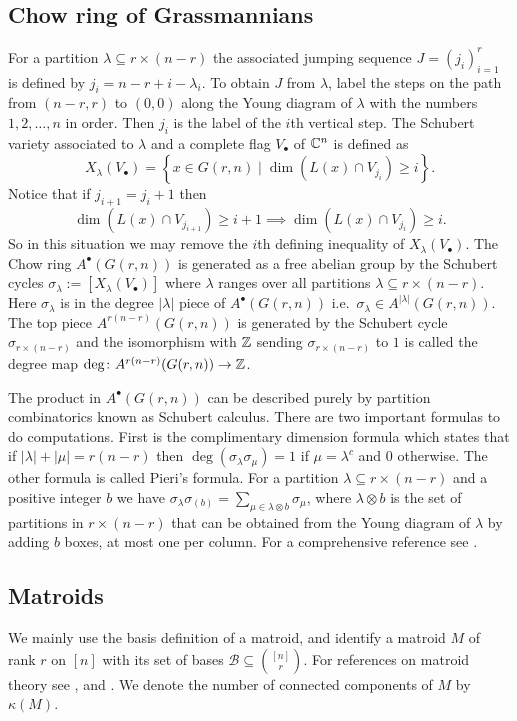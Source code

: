\subsection{Chow ring of Grassmannians}
For a partition \(\lambda \subseteq r\times (n-r)\) the associated jumping sequence \(J = (j_i)_{i = 1}^r\) is defined by \(j_i = n-r+i-\lambda_i\). To obtain \(J\) from \(\lambda\), label the steps on the path from \((n-r,r)\) to \((0,0)\) along the Young diagram of \(\lambda\) with the numbers \(1,2,\dots , n\) in order. Then \(j_i\) is the label of the \(i\)th vertical step. The Schubert variety associated to \(\lambda\) and a complete flag \(V_\bullet\) of \({\mathbb C}^n\) is defined as 
\[
    X_\lambda(V_\bullet) = \left\{ x \in G(r,n) \mid \dim(L(x) \cap V_{j_i}) \geq i \right\}.
\]
Notice that if \(j_{i+1} = j_{i} + 1\) then
\[
    \dim(L(x) \cap V_{j_{i+1}}) \geq i+1 \implies \dim(L(x) \cap V_{j_i}) \geq i.
\]
So in this situation we may remove the \(i\)th defining inequality of \(X_\lambda(V_\bullet)\). The Chow ring $A^\bullet(G(r,n))$ is generated as a free abelian group by the Schubert cycles $\sigma_\lambda := [X_\lambda(V_\bullet)]$ where $\lambda$ ranges over all partitions $\lambda \subseteq r\times(n-r)$. Here $\sigma_\lambda$ is in the degree $|\lambda|$ piece of $A^\bullet(G(r,n))$ i.e.\ $\sigma_\lambda \in A^{|\lambda|}(G(r,n))$. The top piece $A^{r(n-r)}(G(r,n))$ is generated by the Schubert cycle $\sigma_{r\times(n-r)}$ and the isomorphism with ${\mathbb Z}$ sending $\sigma_{r\times(n-r)}$ to $1$ is called the degree map $\deg\colon A^{r(n-r)}(G(r,n)) \to {\mathbb Z}$.

The product in $A^\bullet(G(r,n))$ can be described purely by partition combinatorics known as Schubert calculus. There are two important formulas to do computations. First is the complimentary dimension formula which states that if $|\lambda| + |\mu| = r(n-r)$ then $\deg(\sigma_\lambda \sigma_\mu) = 1$ if $\mu = \lambda^c$ and $0$ otherwise. The other formula is called Pieri's formula. For a partition $\lambda \subseteq r\times(n-r)$ and a positive integer $b$ we have $\sigma_\lambda \sigma_{(b)} = \sum_{\mu \in \lambda \otimes b} \sigma_\mu$, where $\lambda \otimes b$ is the set of partitions in $r\times (n-r)$ that can be obtained from the Young diagram of $\lambda$ by adding $b$ boxes, at most one per column.  For a comprehensive reference see \cite{EisHar}.

\subsection{Matroids}
We mainly use the basis definition of a matroid, and identify a matroid $M$ of rank $r$ on $[n]$ with its set of bases $\mathcal{B} \subseteq \binom{[n]}{r}$. For references on matroid theory see \cite{oxleyBook}, \cite{Katz} and \cite{ardila}. We denote the number of connected components of $M$ by $\kappa(M)$.


